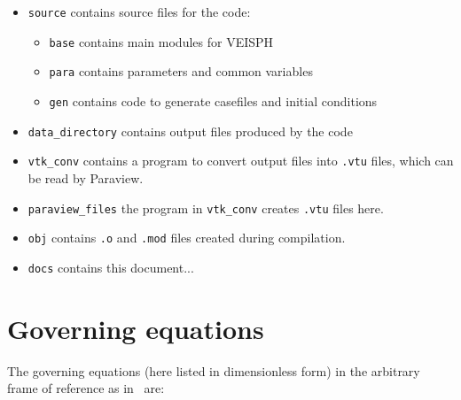 \documentclass[notitlepage]{revtex4-2}
\begin{document}
\begin{itemize}
\item \verb|source| contains source files for the code:
\begin{itemize}
\item \verb|base| contains main modules for VEISPH
\item \verb|para| contains parameters and common variables
\item \verb|gen| contains code to generate casefiles and initial conditions
\end{itemize}
\item \verb|data_directory| contains output files produced by the code
\item \verb|vtk_conv| contains a program to convert output files into \verb|.vtu| files, which can be read by Paraview.
\item \verb|paraview_files| the program in \verb|vtk_conv| creates \verb|.vtu| files here.
\item \verb|obj| contains \verb|.o| and \verb|.mod| files created during compilation.
\item \verb|docs| contains this document...
\end{itemize}  


\section{Governing equations}\label{ge}

The governing equations (here listed in dimensionless form) in the arbitrary frame of reference as in~\cite{king_2021} are:
\end{document}

